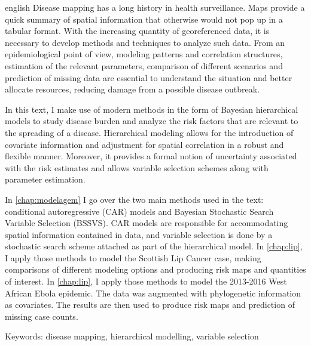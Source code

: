 \begin{resumo}[Abstract]
 \begin{otherlanguage*}{english}
  Disease mapping has a long history in health surveillance. Maps provide a quick summary of spatial information that otherwise would not pop up in a tabular format. With the increasing quantity of georeferenced data, it is necessary to develop methods and techniques to analyze such data. From an epidemiological point of view, modeling patterns and correlation structures, estimation of the relevant parameters, comparison of different scenarios and prediction of missing data are essential to understand the situation and better allocate resources, reducing damage from a possible disease outbreak.
  

  In this text, I make use of modern methods in the form of Bayesian hierarchical models to study disease burden and analyze the risk factors that are relevant to the spreading of a disease. Hierarchical modeling allows for the introduction of covariate information and adjustment for spatial correlation in a robust and flexible manner. Moreover, it provides a formal notion of uncertainty associated with the risk estimates and allows variable selection schemes along with parameter estimation.

  

  In \autoref{chap:modelagem} I go over the two main methods used in the text: conditional autoregressive (CAR) models and Bayesian Stochastic Search Variable Selection (BSSVS). CAR models are responsible for accommodating spatial information contained in data, and variable selection is done by a stochastic search scheme attached as part of the hierarchical model. In \autoref{chap:lip}, I apply those methods to model the Scottish Lip Cancer case, making comparisons of different modeling options and producing risk maps and quantities of interest. In \autoref{chap:lip}, I apply those methods to model the 2013-2016 West African Ebola epidemic. The data was augmented with phylogenetic information as covariates. The results are then used to produce risk maps and prediction of missing case counts.
 \end{otherlanguage*}

 Keywords: disease mapping, hierarchical modelling, variable selection
\end{resumo}